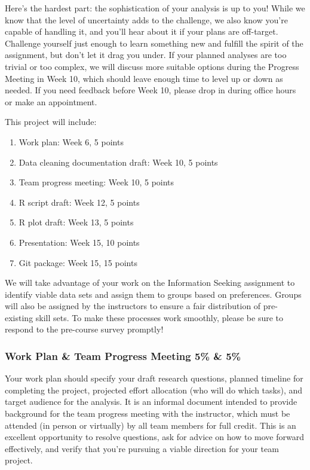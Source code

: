 \documentclass[11pt]{article}
\begin{document}
Here's the hardest part: the sophistication of your analysis is up to you!
While we know that the level of uncertainty adds to the challenge, we also know you're capable of handling it, and you'll hear about it if your plans are off-target.
Challenge yourself just enough to learn something new and fulfill the spirit of the assignment, but don't let it drag you under.
If your planned analyses are too trivial or too complex, we will discuss more suitable options during the Progress Meeting in Week 10, which should leave enough time to level up or down as needed.
If you need feedback before Week 10, please drop in during office hours or make an appointment.

This project will include:
\begin{enumerate}
	\item Work plan: Week 6, 5 points
	\item Data cleaning documentation draft: Week 10, 5 points 
	\item Team progress meeting: Week 10, 5 points
	\item R script draft: Week 12, 5 points
	\item R plot draft: Week 13, 5 points
	\item Presentation: Week 15, 10 points
	\item Git package: Week 15, 15 points
\end{enumerate}

We will take advantage of your work on the Information Seeking assignment to identify viable data sets and assign them to groups based on preferences.
Groups will also be assigned by the instructors to ensure a fair distribution of pre-existing skill sets.
To make these processes work smoothly, please be sure to respond to the pre-course survey promptly!


\subsubsection{Work Plan \& Team Progress Meeting  5\% \& 5\%}
Your work plan should specify your draft research questions, planned timeline for completing the project, projected effort allocation (who will do which tasks), and target audience for the analysis.
It is an informal document intended to provide background for the team progress meeting with the instructor, which must be attended (in person or virtually) by all team members for full credit.
This is an excellent opportunity to resolve questions, ask for advice on how to move forward effectively, and verify that you're pursuing a viable direction for your team project.
\end{document}
